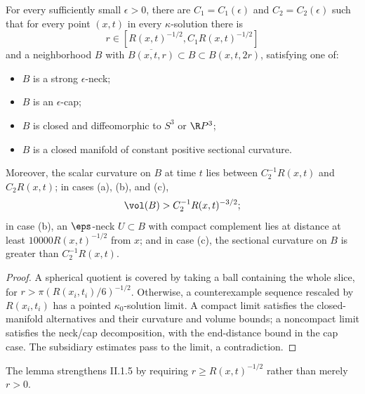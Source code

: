 \begin{lemma}
  \label{lem:kl-three-dimensional-solutions-existence-kappa-solutions-5}
 \label{nbhd}
For every sufficiently small $\epsilon>0$, there are
$C_1=C_1(\epsilon)$ and $C_2=C_2(\epsilon)$ such that for every point
$(x,t)$ in every $\kappa$-solution there is
\[
r\in[R(x,t)^{-1/2},C_1R(x,t)^{-1/2}]
\]
and a neighborhood $B$ with
$\overline{B(x,t,r)}\subset B\subset B(x,t,2r)$, satisfying one of:
\begin{itemize}
\item[(a)] $B$ is a strong $\epsilon$-neck;
\item[(b)] $B$ is an $\epsilon$-cap;
\item[(c)] $B$ is closed and diffeomorphic to $S^3$ or $\R P^3$;
\item[(d)] $B$ is a closed manifold of constant positive sectional curvature.
\end{itemize}
Moreover, the scalar curvature on $B$ at time $t$ lies between
$C_2^{-1}R(x,t)$ and $C_2R(x,t)$; in cases (a), (b), and (c),
\[
\vol(B)>C_2^{-1}R(x,t)^{-3/2};
\]
in case (b), an $\eps$-neck $U\subset B$ with compact complement lies at
distance at least $10000R(x,t)^{-1/2}$ from $x$; and in case (c), the
sectional curvature on $B$ is greater than $C_2^{-1}R(x,t)$.
\end{lemma}

\begin{proof}
\sketch A spherical quotient is covered by taking a ball containing the whole
slice, for $r>\pi(R(x_i,t_i)/6)^{-1/2}$. Otherwise, a counterexample sequence
rescaled by $R(x_i,t_i)$ has a pointed $\kappa_0$-solution limit. A compact
limit satisfies the closed-manifold alternatives and their curvature and
volume bounds; a noncompact limit satisfies the neck/cap decomposition, with
the end-distance bound in the cap case. The subsidiary estimates pass to the
limit, a contradiction.
\end{proof}

\begin{remark}
  \label{rem:kl-three-dimensional-solutions-structural-remark-three-dimensional-solutions}

The lemma strengthens II.1.5 by requiring
$r\ge R(x,t)^{-1/2}$ rather than merely $r>0$.
\end{remark}

